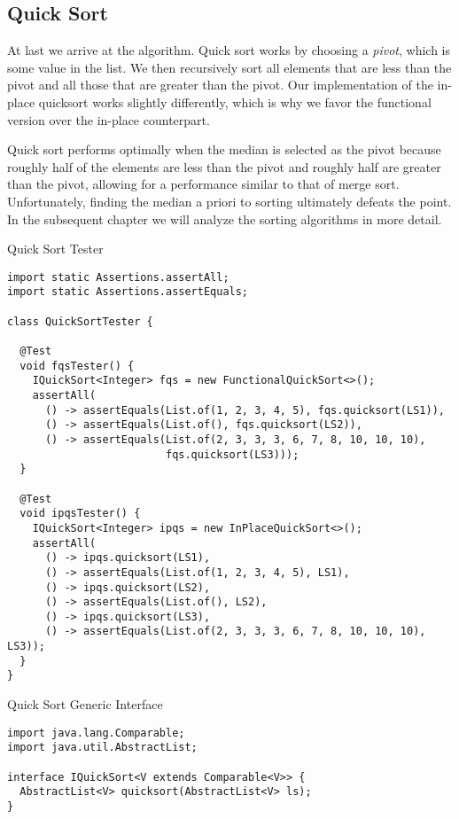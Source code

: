 \subsection{Quick Sort}
At last we arrive at the  algorithm. Quick sort works by choosing a \emph{pivot}, which is some value in the list. We then recursively sort all elements that are less than the pivot and all those that are greater than the pivot. Our implementation of the in-place quicksort works slightly differently, which is why we favor the functional version over the in-place counterpart. 

Quick sort performs optimally when the median is selected as the pivot because roughly half of the elements are less than the pivot and roughly half are greater than the pivot, allowing for a performance similar to that of merge sort. Unfortunately, finding the median a priori to sorting ultimately defeats the point. In the subsequent chapter we will analyze the sorting algorithms in more detail.

\begin{cl}[]{Quick Sort Tester}
\begin{lstlisting}[language=MyJava]
import static Assertions.assertAll;
import static Assertions.assertEquals;

class QuickSortTester {

  @Test
  void fqsTester() {
    IQuickSort<Integer> fqs = new FunctionalQuickSort<>();
    assertAll(
      () -> assertEquals(List.of(1, 2, 3, 4, 5), fqs.quicksort(LS1)),
      () -> assertEquals(List.of(), fqs.quicksort(LS2)),
      () -> assertEquals(List.of(2, 3, 3, 3, 6, 7, 8, 10, 10, 10), 
                         fqs.quicksort(LS3)));
  }

  @Test
  void ipqsTester() {
    IQuickSort<Integer> ipqs = new InPlaceQuickSort<>();
    assertAll(
      () -> ipqs.quicksort(LS1),
      () -> assertEquals(List.of(1, 2, 3, 4, 5), LS1),
      () -> ipqs.quicksort(LS2),
      () -> assertEquals(List.of(), LS2),
      () -> ipqs.quicksort(LS3),
      () -> assertEquals(List.of(2, 3, 3, 3, 6, 7, 8, 10, 10, 10), LS3));
  }
}
\end{lstlisting}
\end{cl}

\begin{cl}[]{Quick Sort Generic Interface}
\begin{lstlisting}[language=MyJava]
import java.lang.Comparable;
import java.util.AbstractList;

interface IQuickSort<V extends Comparable<V>> {
  AbstractList<V> quicksort(AbstractList<V> ls);
}
\end{lstlisting}
\end{cl}

